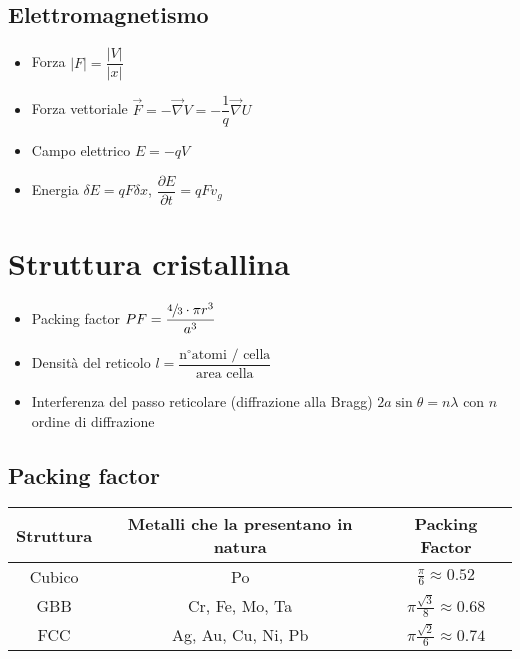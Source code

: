 \documentclass[9pt]{extarticle}
\begin{document}
\subsection{Elettromagnetismo}
\begin{itemize}
  \item Forza \( |F| = \dfrac{|V|}{|x|} \)
  \item Forza vettoriale \( \vec{F} = - \vec{\nabla} V = -\dfrac{1}{q} \vec{\nabla} U \)
  \item Campo elettrico \( E = -q V \)
  \item Energia \( \delta E = q F \delta x \), \( \dfrac{\partial E}{\partial t} = q F v_g  \)
\end{itemize}

\newpage

\section{Struttura cristallina}
\begin{itemize}
  \item Packing factor \( PF = \dfrac{ \sfrac{4}{3} \cdot \pi r^3}{a^3} \)
  \item Densità del reticolo \( l = \dfrac{\text{n} ^ \circ \text{atomi / cella}}{\text{area cella}} \)
  \item Interferenza del passo reticolare (diffrazione alla Bragg) \(  2a \sin \theta = n \lambda \) con \( n \) ordine di diffrazione
\end{itemize}

\subsection{Packing factor}
\vspace{1cm}
\renewcommand{\arraystretch}{2}
\begin{center}
  \begin{tabular}{|c|c|c|}
    \hline
    \textbf{Struttura} & \textbf{Metalli che la presentano in natura} & \textbf{Packing Factor}                  \\
    \hline
    Cubico             & Po                                           & \(\frac{\pi}{6} \approx 0.52 \)          \\
    \hline
    GBB                & Cr, Fe, Mo, Ta                               & \(\pi \frac{\sqrt{3}}{8} \approx 0.68 \) \\
    \hline
    FCC                & Ag, Au, Cu, Ni, Pb                           & \(\pi \frac{\sqrt{2}}{6} \approx 0.74 \) \\
    \hline
  \end{tabular}
\end{center}
\renewcommand{\arraystretch}{1}
\vspace{0.75cm}
\end{document}
